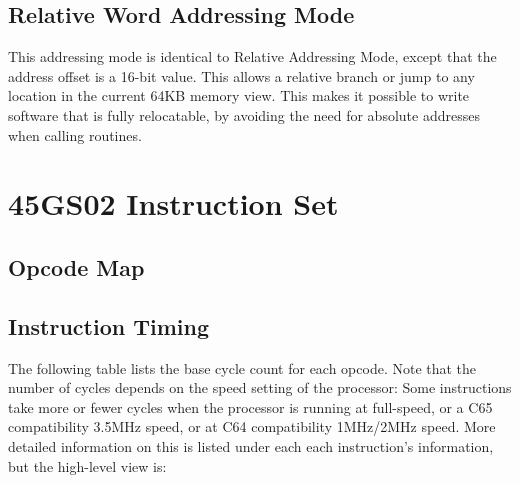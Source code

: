 \subsection{Relative Word Addressing Mode}

This addressing mode is identical to Relative Addressing Mode, except that
the address offset is a 16-bit value. This allows a relative branch or jump
to any location in the current 64KB memory view.  This makes it possible
to write software that is fully relocatable, by avoiding the need for absolute
addresses when calling routines.

\section{45GS02 Instruction Set}

\subsection{Opcode Map}

\begin{center}
\end{center}

\subsection{Instruction Timing}

The following table lists the base cycle count for each opcode.
Note that the number of cycles depends on the speed setting of the
processor: Some instructions take more or fewer cycles when the
processor is running at full-speed, or a C65 compatibility 3.5MHz speed,
or at C64 compatibility 1MHz/2MHz speed.  More detailed information on
this is listed under each each instruction's information, but the high-level
view is:

